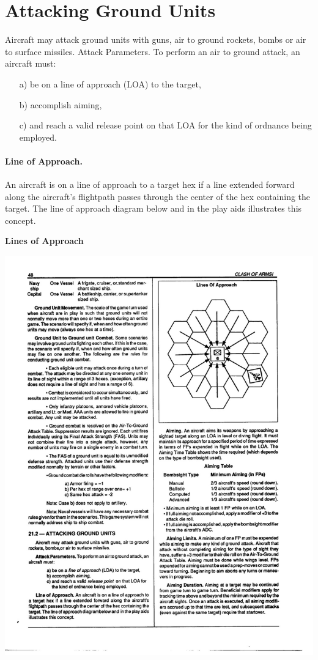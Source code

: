 \section{Attacking Ground Units}

Aircraft may attack ground units with guns, air to ground rockets, bombs or air to surface missiles.
Attack Parameters. To perform an air to ground attack, an aircraft must:
\begin{enumerate}
    \item[a)] be on a line of approach (LOA) to the target,
    \item[b)] accomplish aiming,
    \item[c)] and reach a valid release point on that LOA for the kind of ordnance being employed.
\end{enumerate}

\paragraph{Line of Approach.} An aircraft is on a line of approach to a target hex if a line extended forward along the aircraft's flightpath passes through the center of the hex containing the target. The line of approach diagram below and in the play aids illustrates this concept. 

\begin{centering}

{\bfseries Lines of Approach}

\includegraphics[width=0.7\linewidth]{figures/figure-lines-of-approach.pdf}

\end{centering}

